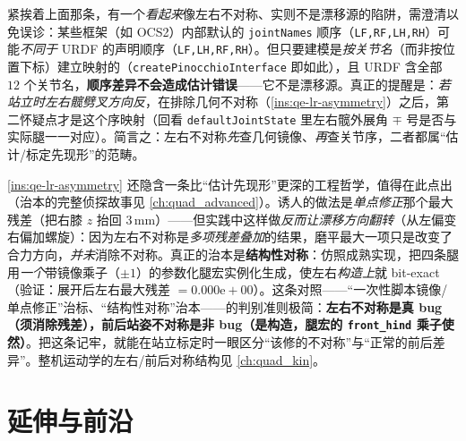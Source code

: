 \begin{note}\label{note:qe-jointorder}
紧挨着上面那条，有一个\emph{看起来}像左右不对称、实则不是漂移源的陷阱，需澄清以免误诊：某些框架（如 OCS2）内部默认的 \texttt{jointNames} 顺序（\texttt{LF,RF,LH,RH}）可能\emph{不同于} URDF 的声明顺序（\texttt{LF,LH,RF,RH}）。但只要建模是\emph{按关节名}（而非按位置下标）建立映射的（\texttt{createPinocchioInterface} 即如此），且 URDF 含全部 $12$ 个关节名，\textbf{顺序差异不会造成估计错误}——它不是漂移源。真正的提醒是：\emph{若站立时左右髋劈叉方向反}，在排除几何不对称（\cref{ins:qe-lr-asymmetry}）之后，第二怀疑点才是这个序映射（回看 \texttt{defaultJointState} 里左右髋外展角 $\mp$ 号是否与实际腿一一对应）。简言之：左右不对称\emph{先}查几何镜像、\emph{再}查关节序，二者都属“估计/标定先现形”的范畴。
\end{note}

\begin{insight}\label{ins:qe-lr-structural}
\cref{ins:qe-lr-asymmetry} 还隐含一条比“估计先现形”更深的工程哲学，值得在此点出（治本的完整侦探故事见 \cref{ch:quad_advanced}）。诱人的做法是\emph{单点修正}那个最大残差（把右膝 $z$ 抬回 $3\,\mathrm{mm}$）——但实践中这样做\emph{反而让漂移方向翻转}（从左偏变右偏加螺旋）：因为左右不对称是\emph{多项残差叠加}的结果，磨平最大一项只是改变了合力方向，\emph{并未}消除不对称。真正的治本是\textbf{结构性对称}：仿照成熟实现，把四条腿用\emph{一个}带镜像乘子（$\pm1$）的参数化腿宏实例化生成，使左右\emph{构造上}就 bit-exact（验证：展开后左右最大残差 $=0.000\mathrm{e}{+}00$）。这条对照——“一次性脚本镜像/单点修正”治标、“结构性对称”治本——的判别准则极简：\textbf{左右不对称是真 bug（须消除残差），前后站姿不对称是非 bug（是构造，腿宏的 \texttt{front\_hind} 乘子使然）}。把这条记牢，就能在站立标定时一眼区分“该修的不对称”与“正常的前后差异”。整机运动学的左右/前后对称结构见 \cref{ch:quad_kin}。
\end{insight}

\section{延伸与前沿}
\label{sec:qe-frontier}

